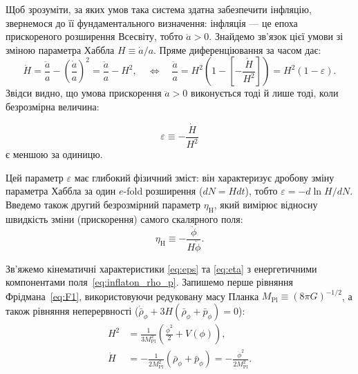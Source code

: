 \documentclass[12pt, a4paper]{article}
\begin{document}
Щоб зрозуміти, за яких умов така система здатна забезпечити інфляцію, звернемося до її фундаментального визначення: інфляція --- це епоха прискореного розширення Всесвіту, тобто $\ddot{a} > 0$. Знайдемо зв'язок цієї умови зі зміною параметра Хаббла $H \equiv \dot{a}/a$. Пряме диференціювання за часом дає:
\begin{equation*}
  \dot{H} = \frac{\ddot{a}}{a} - \left(\frac{\dot{a}}{a}\right)^2 = \frac{\ddot{a}}{a} - H^2,
  \quad \Leftrightarrow \quad
  \frac{\ddot{a}}{a} = H^2 \left( 1 - \left[-\frac{\dot{H}}{H^2}\right] \right) =  H^2 \left( 1 - \varepsilon \right) .
\end{equation*}
Звідси видно, що умова прискорення $\ddot{a} > 0$ виконується тоді й лише тоді, коли безрозмірна величина:

\begin{equation}\label{eq:eps}
    \varepsilon \equiv -\frac{\dot{H}}{H^2}
\end{equation}
є меншою за одиницю.

Цей параметр $\varepsilon$ має глибокий фізичний зміст: він характеризує дробову зміну параметра Хаббла за один $e$-fold розширення ($dN = H dt$), тобто $\varepsilon = -d\ln H / dN$. Введемо також другий безрозмірний параметр $\eta_{\mathrm{H}}$, який вимірює відносну швидкість зміни (прискорення) самого скалярного поля:
\begin{equation}\label{eq:eta}
  \eta_{\mathrm{H}} \equiv -\frac{\ddot{\phi}}{H\dot{\phi}}.
\end{equation}

Зв'яжемо кінематичні характеристики \eqref{eq:eps} та \eqref{eq:eta} з енергетичними компонентами поля~\eqref{eq:inflaton_rho_p}. Запишемо перше рівняння Фрідмана~\eqref{eq:F1}, використовуючи редуковану масу Планка $M_\mathrm{Pl} \equiv (8\pi G)^{-1/2}$, а також рівняння неперервності ($\dot{\bar{\rho}}_\phi + 3H(\bar{\rho}_\phi + \bar{p}_\phi) = 0$):
\begin{align}
  H^2 &= \frac{1}{3M_\mathrm{Pl}^2} \left(\frac{\dot\phi^2}{2} + V(\phi)\right), \label{eq:friedmann_inflaton} \\
  \dot{H} &= -\frac{1}{2M_\mathrm{Pl}^2}(\bar{\rho}_\phi + \bar{p}_\phi) = -\frac{\dot{\phi}^2}{2M_\mathrm{Pl}^2}. \label{eq:hdot_inflaton}
\end{align}
\end{document}

